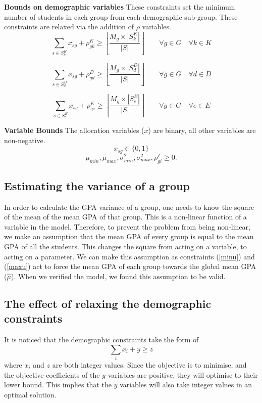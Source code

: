 \documentclass[12pt]{ORSNZ}
\begin{document}
\begin{description}
\textbf{Bounds on demographic variables} These constraints set the minimum number of students in each group from each demographic sub-group. These constraints are relaxed via the addition of $\rho$ variables.
\begin{equation} \label{con3}
\sum_{s \in S^K_k} x_{sg} + \rho^K_{gk} \geq \left\lfloor\frac{M_g \times |S^K_k|}{|S|}\right\rfloor \qquad \mbox{$\forall g \in G \quad \forall k \in K$}
\end{equation}

\begin{equation} \label{con4}
\sum_{s \in S^D_d} x_{sg} + \rho^D_{gd}  \geq \left\lfloor\frac{M_g \times |S^D_d|}{|S|}\right\rfloor \qquad \mbox{$\forall g \in G \quad \forall d \in D$}
\end{equation}

\begin{equation} \label{con5}
\sum_{s \in S^E_e} x_{sg} + \rho^E_{ge}  \geq \left\lfloor\frac{M_g \times |S^E_e|}{|S|}\right\rfloor \qquad \mbox{$\forall g \in G \quad \forall e \in E$}
\end{equation}

\textbf{Variable Bounds} The allocation variables ($x$) are binary, all other variables are non-negative.
\[x_{sg} \in \{0, 1\}\]
\[\mu_{min}, \mu_{max}, \sigma^2_{min}, \sigma^2_{max}, \rho^I_{gi}  \ge 0.\]

\end{description}
\subsection{Estimating the variance of a group}
In order to calculate the GPA variance of a group, one needs to know the square of the mean of the mean GPA of that group. This is a non-linear function of a variable in the model. Therefore, to prevent the problem from being non-linear, we make an assumption that the mean GPA of every group is equal to the mean GPA of all the students. This changes the square from acting on a variable, to acting on a parameter. We can make this assumption as constraints (\ref{minu}) and (\ref{maxu}) act to force the mean GPA of each group towards the global mean GPA ($\hat{\mu}$). When we verified the model, we found this assumption to be valid.

\subsection{The effect of relaxing the demographic constraints}
It is noticed that the demographic constraints take the form of 
\begin{equation}
\sum_i x_i + y \geq z
\end{equation}
where $x_i$ and $z$ are both integer values. Since the objective is to minimise, and the objective coefficients of the $y$ variables are positive, they will optimise to their lower bound. This implies that the $y$ variables will also take integer values in an optimal solution. 
\end{document}
